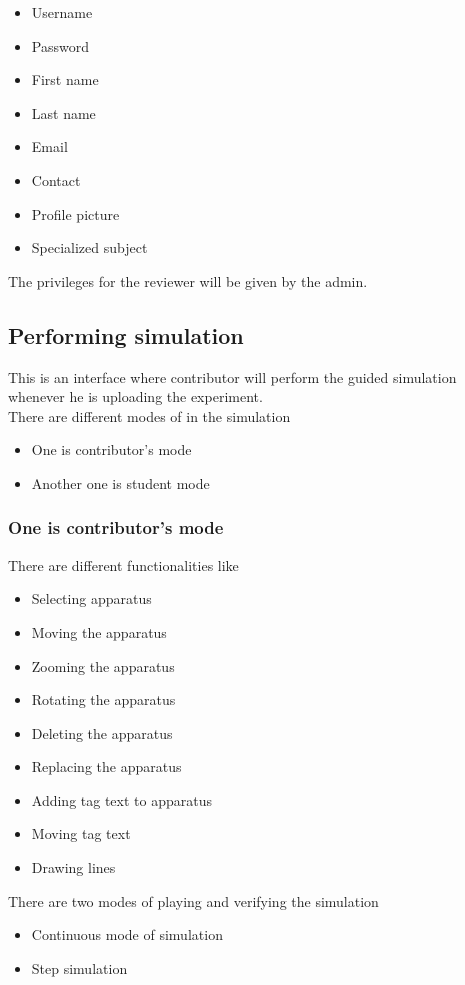 \documentclass[12pt]{report}
\begin{document}
\begin{itemize}
\item Username
\item Password
\item First name
\item Last name
\item Email
\item Contact
\item Profile picture
\item Specialized subject
\end{itemize}

The privileges for the reviewer will be given by the admin.

\subsection{Performing simulation}

This is an interface where contributor will perform the guided simulation whenever he is uploading the experiment.\\
There are different modes of  in the simulation
\begin{itemize}
\item One is contributor’s mode
\item Another one is student mode 
\end{itemize}


\subsubsection{One is contributor's mode}

 There are different functionalities like 
\begin{itemize}
\item Selecting apparatus
\item Moving the apparatus
\item Zooming the apparatus
\item Rotating the apparatus
\item Deleting the apparatus
\item Replacing the apparatus
\item Adding tag text to apparatus
\item Moving tag text
\item Drawing lines
\end{itemize} 

There are two modes of playing  and verifying the simulation
\begin{itemize}
\item Continuous mode of simulation
\item Step simulation
\end{itemize}
\end{document}
